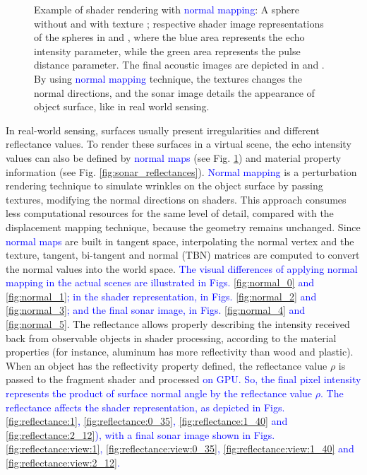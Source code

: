 \documentclass[final,5p,times]{elsarticle}
\begin{document}
\begin{figure}[!ht]
{        \label{fig:normal_5}
    }
    \captionsetup{justification=justified}
    \caption{Example of shader rendering with \textcolor{blue}{normal mapping}:
    A sphere without  and with texture  ; respective shader image representations of the spheres  in  and , where the blue area represents the echo intensity parameter, while the green area represents the pulse distance parameter. The final acoustic images are depicted in  and . By using \textcolor{blue}{normal mapping} technique, the textures changes the normal directions, and the sonar image details the appearance of object surface, like in real world sensing.}
    \label{fig:sonar_normal_mapping}
\end{figure}

In real-world sensing, surfaces usually present irregularities
and different reflectance values. To render these surfaces in a virtual scene, the echo intensity values can also be defined by \textcolor{blue}{normal maps} (see Fig. \ref{fig:sonar_normal_mapping}) and material property information (see Fig. \ref{fig:sonar_reflectances}). \textcolor{blue}{Normal mapping} is a perturbation rendering technique to simulate wrinkles on the object surface by passing textures, modifying the normal directions on shaders. This approach consumes less computational
resources for the same level of detail, compared with the displacement mapping
technique, because the geometry remains unchanged. Since \textcolor{blue}{normal maps} are built in tangent space, interpolating the normal vertex and the texture, tangent, bi-tangent and normal (TBN) matrices are computed to convert the normal values into the world space. \textcolor{blue}{The visual differences of applying normal mapping in the actual scenes are illustrated in Figs. \ref{fig:normal_0} and \ref{fig:normal_1}; in the shader representation, in Figs. \ref{fig:normal_2} and \ref{fig:normal_3}; and the final sonar image, in Figs. \ref{fig:normal_4} and \ref{fig:normal_5}}. The reflectance allows properly describing the intensity received back from observable objects in shader processing, according to the material
properties (for instance, aluminum has more reflectivity than wood and plastic).
When an object has the reflectivity property defined, the reflectance value
$\rho$ is passed to the fragment shader and processed \textcolor{blue}{on GPU. So, the final pixel intensity represents the product of surface normal angle by the reflectance value $\rho$. The reflectance affects the shader representation, as depicted in Figs. \ref{fig:reflectance:1}, \ref{fig:reflectance:0_35}, \ref{fig:reflectance:1_40} and \ref{fig:reflectance:2_12}), with a final sonar image shown in Figs. \ref{fig:reflectance:view:1}, \ref{fig:reflectance:view:0_35}, \ref{fig:reflectance:view:1_40} and \ref{fig:reflectance:view:2_12}.}
\end{document}
